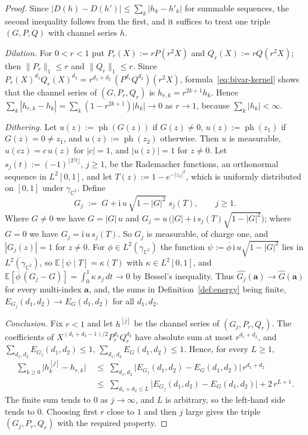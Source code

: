 \documentclass[11pt,reqno]{amsart}
\theoremstyle{definition}
\numberwithin{equation}{section}
\newcommand{\C}{\mathbb{C}}
\newcommand{\E}{\mathbb{E}}
\newcommand{\ph}{\operatorname{ph}}
\newcommand{\ii}{\mathrm{i}}
\newcommand{\gCC}{\gamma_{\C^2}}
\newcommand{\lone}[1]{\|#1\|_1}
\begin{document}
\begin{proof}
Since $|D(h)-D(h')|\le\sum_k|h_k-h'_k|$ for summable sequences, the second inequality follows from the first, and it suffices to treat one triple $(G,P,Q)$ with channel series $h$.

\emph{Dilation.} For $0<r<1$ put $P_r(X):=rP(r^2X)$ and $Q_r(X):=rQ(r^2X)$; then $\lone{P_r}\le r$ and $\lone{Q_r}\le r$. Since $P_r(X)^{d_1}Q_r(X)^{d_2}=r^{d_1+d_2}\,(P^{d_1}Q^{d_2})(r^2X)$, formula~\eqref{eq:bivar-kernel} shows that the channel series of $(G,P_r,Q_r)$ is $h_{r,k}=r^{2k+1}h_k$. Hence $\sum_k|h_{r,k}-h_k|=\sum_k(1-r^{2k+1})|h_k|\to0$ as $r\to1$, because $\sum_k|h_k|<\infty$.

\emph{Dithering.} Let $u(z):=\ph(G(z))$ if $G(z)\ne0$, $u(z):=\ph(z_1)$ if $G(z)=0\ne z_1$, and $u(z):=\ph(z_2)$ otherwise. Then $u$ is measurable, $u(cz)=c\,u(z)$ for $|c|=1$, and $|u(z)|=1$ for $z\ne0$. Let $s_j(t):=(-1)^{\lfloor2^jt\rfloor}$, $j\ge1$, be the Rademacher functions, an orthonormal sequence in $L^2[0,1]$, and let $T(z):=1-e^{-|z_1|^2}$, which is uniformly distributed on $[0,1]$ under $\gCC$. Define
\[
  G_j\;:=\;G+\ii\,u\,\sqrt{1-|G|^2}\;s_j(T),\qquad j\ge1 .
\]
Where $G\ne0$ we have $G=|G|\,u$ and $G_j=u\,\bigl(|G|+\ii\,s_j(T)\sqrt{1-|G|^2}\bigr)$; where $G=0$ we have $G_j=\ii\,u\,s_j(T)$. So $G_j$ is measurable, of charge one, and $|G_j(z)|=1$ for $z\ne0$. For $\phi\in L^2(\gCC)$ the function $\psi:=\overline{\phi}\,\ii\,u\sqrt{1-|G|^2}$ lies in $L^2(\gCC)$, so $\E[\psi\mid T]=\kappa(T)$ with $\kappa\in L^2[0,1]$, and $\E[\overline{\phi}\,(G_j-G)]=\int_0^1\kappa\,s_j\,dt\to0$ by Bessel's inequality. Thus $\widehat{G_j}(\mathbf{a})\to\widehat{G}(\mathbf{a})$ for every multi-index $\mathbf{a}$, and, the sums in Definition~\ref{def:energy} being finite, $E_{G_j}(d_1,d_2)\to E_G(d_1,d_2)$ for all $d_1,d_2$.

\emph{Conclusion.} Fix $r<1$ and let $h^{[j]}$ be the channel series of $(G_j,P_r,Q_r)$. The coefficients of $X^{(d_1+d_2-1)/2}P_r^{d_1}Q_r^{d_2}$ have absolute sum at most $r^{d_1+d_2}$, and $\sum_{d_1,d_2}E_{G_j}(d_1,d_2)\le1$, $\sum_{d_1,d_2}E_G(d_1,d_2)\le1$. Hence, for every $L\ge1$,
\begin{align*}
  \sum_{k\ge0}\bigl|h^{[j]}_k-h_{r,k}\bigr|&\;\le\;\sum_{d_1,d_2}\bigl|E_{G_j}(d_1,d_2)-E_G(d_1,d_2)\bigr|\,r^{d_1+d_2}\\
  &\;\le\;\sum_{d_1+d_2\le L}\bigl|E_{G_j}(d_1,d_2)-E_G(d_1,d_2)\bigr|+2\,r^{L+1} .
\end{align*}
The finite sum tends to $0$ as $j\to\infty$, and $L$ is arbitrary, so the left-hand side tends to $0$. Choosing first $r$ close to $1$ and then $j$ large gives the triple $(G_j,P_r,Q_r)$ with the required property.
\end{proof}
\end{document}
